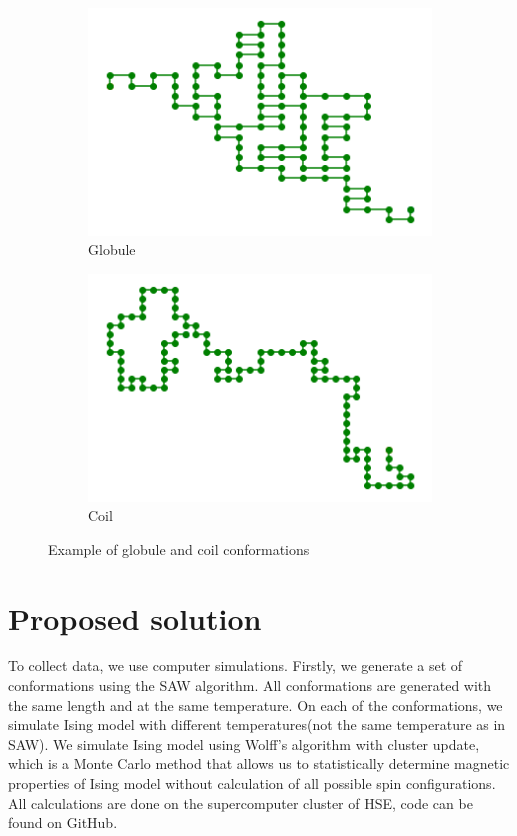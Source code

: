 \documentclass[a4paper,12pt]{article}
\begin{document}
\begin{figure}[h]
	\centering
	\begin{subfigure}[t]{0.3\textwidth}
		\centering
		\includegraphics[width=\textwidth]{images/dense_conf.png} 
		\caption{Globule}
	\end{subfigure}
	\begin{subfigure}[t]{0.3\textwidth}
		\centering
		\includegraphics[width=\textwidth]{images/loose_conf.png} 
		\caption{Coil}
	\end{subfigure}
	\caption{Example of globule and coil conformations}
	\label{fig:conf_example}
\end{figure}

\section*{Proposed solution}
To collect data, we use computer simulations. Firstly, we generate a set of conformations using the SAW algorithm. All conformations are generated with the same length and at the same temperature. On each of the conformations, we simulate Ising model with different temperatures(not the same temperature as in SAW). We simulate Ising model using Wolff's algorithm\cite{wolff_algo} with cluster update, which is a Monte Carlo method that allows us to statistically determine magnetic properties of Ising model without calculation of all possible spin configurations. All calculations are done on the supercomputer cluster of HSE\cite{supercomputer}, code can be found on GitHub\cite{github}.
\end{document}
